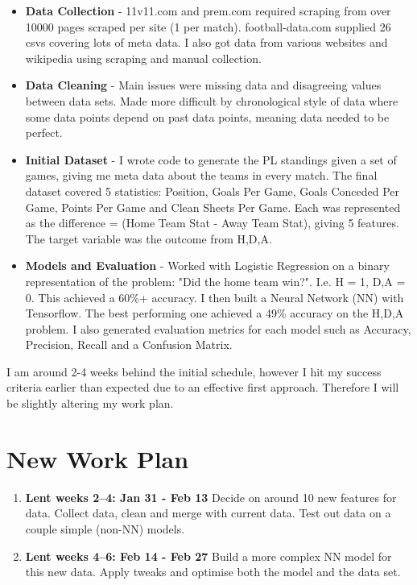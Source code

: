 \documentclass[12pt,a4paper,twoside]{article}
\begin{document}
\begin{itemize}
    \item 
    {
    \textbf{Data Collection} - 11v11.com and prem.com required scraping from over 10000 pages scraped per site (1 per match). football-data.com supplied 26 csvs covering lots of meta data. I also got data from various websites and wikipedia using scraping and manual collection.
    }
    \item
    {
    \textbf{Data Cleaning} - Main issues were missing data and disagreeing values between data sets. Made more difficult by chronological style of data where some data points depend on past data points, meaning data needed to be perfect.
    }
    \item
    {
    \textbf{Initial Dataset} - I wrote code to generate the PL standings given a set of games, giving me meta data about the teams in every match. The final dataset covered 5 statistics: Position, Goals Per Game, Goals Conceded Per Game, Points Per Game and Clean Sheets Per Game. Each was represented as the difference = (Home Team Stat - Away Team Stat), giving 5 features. The target variable was the outcome from {H,D,A}.
    }
    \item
    {
    \textbf{Models and Evaluation} - Worked with Logistic Regression on a binary representation of the problem: "Did the home team win?". I.e. {H} = 1, {D,A} = 0. This achieved a 60\%+ accuracy. I then built a Neural Network (NN) with Tensorflow. The best performing one achieved a 49\% accuracy on the {H,D,A} problem. I also generated evaluation metrics for each model such as Accuracy, Precision, Recall and a Confusion Matrix.
    }
    
    
\end{itemize}

I am around 2-4 weeks behind the initial schedule, however I hit my success criteria earlier than expected due to an effective first approach. Therefore I will be slightly altering my work plan.

\section*{New Work Plan}

\begin{enumerate}

\item \textbf{Lent weeks 2--4: Jan 31 - Feb 13} Decide on around 10 new features for data. Collect data, clean and merge with current data. Test out data on a couple simple (non-NN) models.

\item \textbf{Lent weeks 4--6: Feb 14 - Feb 27} Build a more complex NN model for this new data. Apply tweaks and optimise both the model and the data set.

\end{enumerate}
\end{document}
